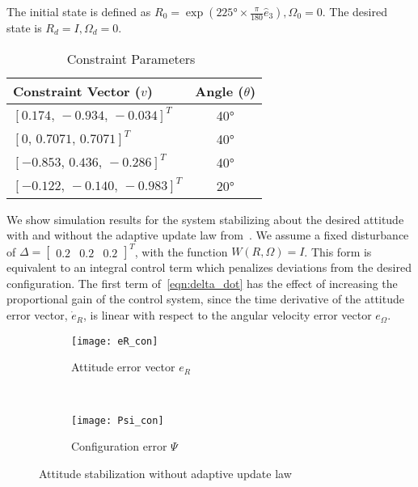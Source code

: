\documentclass[letterpaper, 10 pt, conference]{ieeeconf}  %
\begin{document}
The initial state is defined as \(R_0 =  \exp(\ang{225} \times \frac{\pi}{180} \hat{e}_3), \Omega_0 = 0\). 
The desired state is \( R_d = I,\Omega_d = 0\).
\begin{table}[htbp]
\caption{Constraint Parameters~\label{tab:constraints}}
\begin{center}\begin{tabular}{lc}
Constraint Vector (\( v \)) & Angle (\( \theta \)) \\ \hline \hline 
\([0.174,\,-0.934,\, -0.034]^T\) & \ang{40} \\ \hline 
\([0 ,\, 0.7071 ,\, 0.7071]^T\) & \ang{40} \\ \hline 
\([-0.853 ,\, 0.436 ,\, -0.286]^T\) & \ang{40} \\ \hline 
\([-0.122 ,\,-0.140,\, -0.983]^T\) & \ang{20}\end{tabular} 
\end{center}
\end{table}
We show simulation results for the system stabilizing about the desired attitude with and without the adaptive update law from~.
We assume a fixed disturbance of \(\Delta = \begin{bmatrix} 0.2 & 0.2 & 0.2 \end{bmatrix}^T \), with the function \( W(R,\Omega) = I \).
This form is equivalent to an integral control term which penalizes deviations from the desired configuration.
The first term of~\cref{eqn:delta_dot} has the effect of increasing the proportional gain of the control system, since the time derivative of the attitude error vector, \( \dot{e}_{R} \), is linear with respect to the angular velocity error vector \( e_\Omega\).
\begin{figure} 
	\centering 
	\begin{subfigure}[htbp]{0.5\columnwidth} 
		\texttt{[image: eR\_con]} 
		\caption{Attitude error vector \(e_R\) } \label{fig:eR_con} 
	\end{subfigure}~ %
	\begin{subfigure}[htbp]{0.5\columnwidth} 
		\texttt{[image: Psi\_con]} 
		\caption{Configuration error \( \Psi \)} \label{fig:Psi_con} 
	\end{subfigure}
	\caption{Attitude stabilization without adaptive update law}
	\label{fig:con} 
\end{figure}
\end{document}
